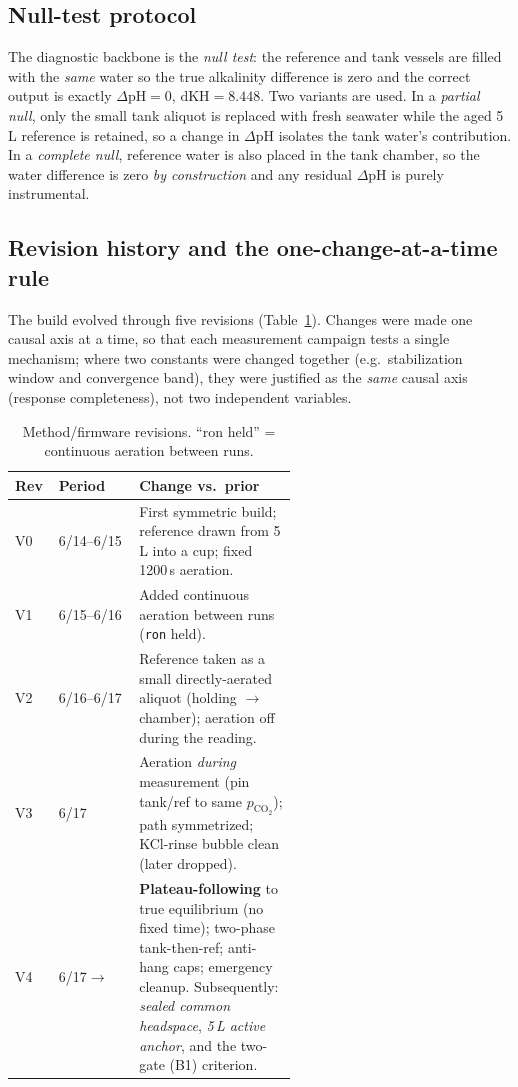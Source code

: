 \documentclass[11pt]{article}
\newcommand{\dpH}{\ensuremath{\Delta\mathrm{pH}}}
\newcommand{\pco}{\ensuremath{p_{\mathrm{CO_2}}}}
\begin{document}
\subsection{Null-test protocol}
The diagnostic backbone is the \emph{null test}: the reference and tank vessels
are filled with the \emph{same} water so the true alkalinity difference is zero
and the correct output is exactly $\dpH=0$, $\mathrm{dKH}=8.448$. Two variants
are used. In a \emph{partial null}, only the small tank aliquot is replaced with
fresh seawater while the aged 5\,L reference is retained, so a change in \dpH{}
isolates the tank water's contribution. In a \emph{complete null}, reference
water is also placed in the tank chamber, so the water difference is zero
\emph{by construction} and any residual \dpH{} is purely instrumental.

\subsection{Revision history and the one-change-at-a-time rule}
The build evolved through five revisions (Table~\ref{tab:versions}). Changes
were made one causal axis at a time, so that each measurement campaign tests a
single mechanism; where two constants were changed together
(e.g.\ stabilization window and convergence band), they were justified as the
\emph{same} causal axis (response completeness), not two independent variables.

\begin{table}[t]
\centering
\caption{Method/firmware revisions. ``ron held'' = continuous aeration between runs.}
\label{tab:versions}
\footnotesize
\begin{tabular}{@{}llp{0.56\linewidth}@{}}
\toprule
Rev & Period & Change vs.\ prior \\
\midrule
V0 & 6/14--6/15 & First symmetric build; reference drawn from 5\,L into a cup; fixed 1200\,s aeration. \\
V1 & 6/15--6/16 & Added continuous aeration between runs (\texttt{ron} held). \\
V2 & 6/16--6/17 & Reference taken as a small directly-aerated aliquot (holding $\to$ chamber); aeration off during the reading. \\
V3 & 6/17 & Aeration \emph{during} measurement (pin tank/ref to same \pco{}); path symmetrized; KCl-rinse bubble clean (later dropped). \\
V4 & 6/17$\to$ & \textbf{Plateau-following} to true equilibrium (no fixed time); two-phase tank-then-ref; anti-hang caps; emergency cleanup. Subsequently: \emph{sealed common headspace}, \emph{5\,L active anchor}, and the two-gate (B1) criterion. \\
\bottomrule
\end{tabular}
\end{table}
\end{document}
